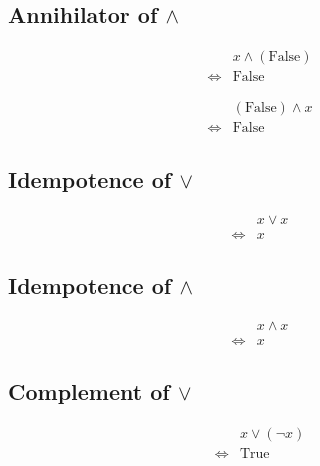 \subsection{Annihilator of $\land$}
\begin{prop}
\label{Proposition:land_annihilator_1}
\begin{align*}
& x \land (\text{False}) \\
\iff & \text{False}
\end{align*}
\end{prop}

\begin{prop}
\label{Proposition:land_annihilator_2}
\begin{align*}
& (\text{False}) \land x \\
\iff & \text{False}
\end{align*}
\end{prop}

\subsection{Idempotence of $\lor$}
\begin{prop}
\label{Proposition:lor_idempotence}
\begin{align*}
& x \lor x \\
\iff & x
\end{align*}
\end{prop}

\subsection{Idempotence of $\land$}
\begin{prop}
\label{Proposition:land_idempotence}
\begin{align*}
& x \land x \\
\iff & x
\end{align*}
\end{prop}

\subsection{Complement of $\lor$}
\begin{prop}
\label{Proposition:lor_complement_1}
\begin{align*}
& x \lor (\lnot x) \\
\iff & \text{True}
\end{align*}
\end{prop}

